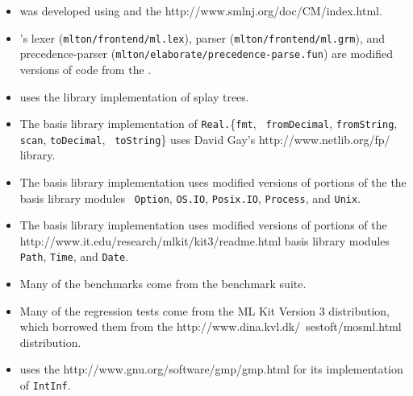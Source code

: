 \begin{itemize}

\item
{\mlton} was developed using
and the
		  {http://www.smlnj.org/doc/CM/index.html}.

\item
{\mlton}'s lexer ({\tt mlton/frontend/ml.lex}), 
parser ({\tt mlton/frontend/ml.grm}),
and precedence-parser ({\tt mlton/elaborate/precedence-parse.fun})
are modified versions of code from the {\smlnj}.

\item
{\mlton} uses the {\smlnj} library implementation of splay trees.

\item
The {\mlton} basis library implementation of {\tt Real.}\{{\tt fmt}, {\tt
fromDecimal}, {\tt fromString}, {\tt scan}, {\tt toDecimal}, {\tt
toString}\} uses David Gay's
		  {http://www.netlib.org/fp/}
library.

\item
The {\mlton} basis library implementation uses modified versions of
portions of the the {\smlnj} basis library modules {\tt
Option}, {\tt OS.IO}, {\tt Posix.IO}, {\tt Process}, and {\tt Unix}.

\item
The {\mlton} basis library implementation uses modified versions of
portions of the
		  {http://www.it.edu/research/mlkit/kit3/readme.html}
basis library modules {\tt Path}, {\tt Time}, and {\tt Date}.

\item
Many of the benchmarks come from the {\smlnj} benchmark suite.

\item
Many of the regression tests come from the ML Kit Version 3 distribution, which
borrowed them from the
		  {http://www.dina.kvl.dk/~sestoft/mosml.html}
distribution.

\item
{\mlton} uses the
		  {http://www.gnu.org/software/gmp/gmp.html}
for its implementation of {\tt IntInf}.

\end{itemize}
